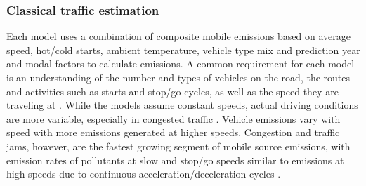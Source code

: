 \documentclass[preprint,12pt,a4paper,authoryear]{elsarticle}
\begin{document}
\begin{linenumbers}
\subsubsection{Classical traffic estimation} \label{sssec:ClassicalTraffic}

Each model uses a combination of composite mobile emissions based on average speed, hot/cold starts, ambient temperature, vehicle type mix and prediction year and modal factors to calculate emissions. A common requirement for each model is an understanding of the number and types of vehicles on the road, the routes and activities such as starts and stop/go cycles, as well as the speed they are traveling at \citep{Franco2013}. While the models assume constant speeds, actual driving conditions are more variable, especially in congested traffic \citep{Freeman2015b}. Vehicle emissions vary with speed with more emissions generated at higher speeds. Congestion and traffic jams, however, are the fastest growing segment of mobile source emissions, with emission rates of pollutants at slow and stop/go speeds similar to emissions at high speeds due to continuous acceleration/deceleration cycles \citep{Barth2009}.


\end{linenumbers}
\end{document}

